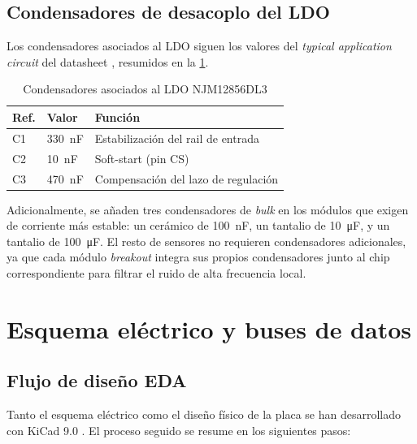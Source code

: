 \subsection{Condensadores de desacoplo del LDO}
\label{sec:caps_desacoplo}

Los condensadores asociados al LDO siguen los valores del \textit{typical
application circuit} del datasheet \cite{ds_njm12856}, resumidos en la
\cref{tab:caps_ldo}.

\begin{table}[H]
    \centering
    \caption{Condensadores asociados al LDO NJM12856DL3}
    \label{tab:caps_ldo}
    \footnotesize
    \begin{tabularx}{0.85\linewidth}{l l X}
        \toprule
        \textbf{Ref.} & \textbf{Valor} & \textbf{Función} \\
        \midrule
        C1 & \SI{330}{\nano\farad} & Estabilización del rail de entrada \\
        C2 & \SI{10}{\nano\farad}  & Soft-start (pin CS) \\
        C3 & \SI{470}{\nano\farad} & Compensación del lazo de regulación \\
        \bottomrule
    \end{tabularx}
\end{table}

Adicionalmente, se añaden tres condensadores de \textit{bulk} en los módulos
que exigen de corriente más estable: un cerámico de \SI{100}{\nano\farad}, un tantalio de
\SI{10}{\micro\farad},  y un tantalio de \SI{100}{\micro\farad}. El resto de sensores no
requieren condensadores adicionales, ya que cada módulo \textit{breakout} integra
sus propios condensadores junto al chip correspondiente para filtrar el ruido de alta frecuencia local.


\section{Esquema eléctrico y buses de datos}
\label{sec:esquema}

\subsection{Flujo de diseño EDA}
\label{sec:flujo_eda}

Tanto el esquema eléctrico como el diseño físico de la placa se han desarrollado con KiCad 9.0 \cite{kicad_pcbnew}. El proceso seguido se resume en los siguientes pasos:

